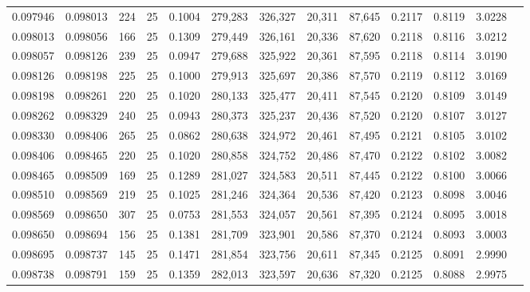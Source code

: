 \begin{tabular}{rrrrrrrrrrrrr}
0.097946 & 0.098013 &   224 &  25 &                                     0.1004 & 279,283 & 326,327 &  20,311 &  87,645 & 0.2117 & 0.8119 & 3.0228 \\
0.098013 & 0.098056 &   166 &  25 &                                     0.1309 & 279,449 & 326,161 &  20,336 &  87,620 & 0.2118 & 0.8116 & 3.0212 \\
0.098057 & 0.098126 &   239 &  25 &                                     0.0947 & 279,688 & 325,922 &  20,361 &  87,595 & 0.2118 & 0.8114 & 3.0190 \\
0.098126 & 0.098198 &   225 &  25 &                                     0.1000 & 279,913 & 325,697 &  20,386 &  87,570 & 0.2119 & 0.8112 & 3.0169 \\
0.098198 & 0.098261 &   220 &  25 &                                     0.1020 & 280,133 & 325,477 &  20,411 &  87,545 & 0.2120 & 0.8109 & 3.0149 \\
0.098262 & 0.098329 &   240 &  25 &                                     0.0943 & 280,373 & 325,237 &  20,436 &  87,520 & 0.2120 & 0.8107 & 3.0127 \\
0.098330 & 0.098406 &   265 &  25 &                                     0.0862 & 280,638 & 324,972 &  20,461 &  87,495 & 0.2121 & 0.8105 & 3.0102 \\
0.098406 & 0.098465 &   220 &  25 &                                     0.1020 & 280,858 & 324,752 &  20,486 &  87,470 & 0.2122 & 0.8102 & 3.0082 \\
0.098465 & 0.098509 &   169 &  25 &                                     0.1289 & 281,027 & 324,583 &  20,511 &  87,445 & 0.2122 & 0.8100 & 3.0066 \\
0.098510 & 0.098569 &   219 &  25 &                                     0.1025 & 281,246 & 324,364 &  20,536 &  87,420 & 0.2123 & 0.8098 & 3.0046 \\
0.098569 & 0.098650 &   307 &  25 &                                     0.0753 & 281,553 & 324,057 &  20,561 &  87,395 & 0.2124 & 0.8095 & 3.0018 \\
0.098650 & 0.098694 &   156 &  25 &                                     0.1381 & 281,709 & 323,901 &  20,586 &  87,370 & 0.2124 & 0.8093 & 3.0003 \\
0.098695 & 0.098737 &   145 &  25 &                                     0.1471 & 281,854 & 323,756 &  20,611 &  87,345 & 0.2125 & 0.8091 & 2.9990 \\
0.098738 & 0.098791 &   159 &  25 &                                     0.1359 & 282,013 & 323,597 &  20,636 &  87,320 & 0.2125 & 0.8088 & 2.9975 \\

\end{tabular}
